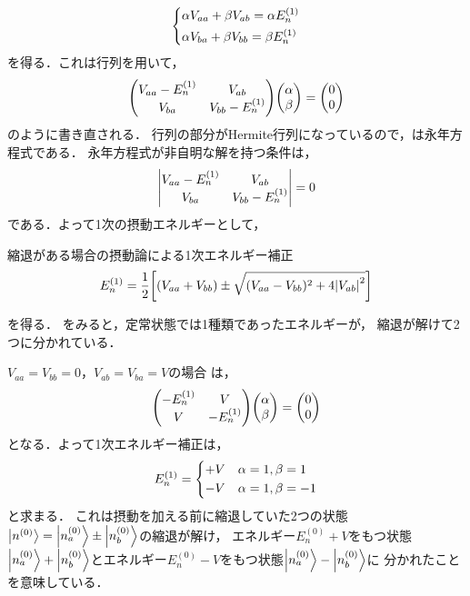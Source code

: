 \documentclass{report}
\begin{document}
  \begin{align}
    \begin{dcases}
      \alpha V_{aa} + \beta V_{ab} = \alpha E_n^{(1)}\\
      \alpha V_{ba} + \beta V_{bb} = \beta E_n^{(1)}
    \end{dcases}
  \end{align}
  を得る．これは行列を用いて，
  \begin{align}
    \mqty(
      V_{aa} - E_n^{(1)} & V_{ab} \\
      V_{ba} & V_{bb} - E_n^{(1)})
    \mqty(\alpha\\ \beta)
    =
    \mqty(0 \\ 0)\label{secular-eq}
  \end{align}
  のように書き直される．
  行列の部分がHermite行列になっているので，は永年方程式である．
  永年方程式が非自明な解を持つ条件は，
  \begin{align}
    \mqty|
      V_{aa} - E_n^{(1)} &  V_{ab}\\
      V_{ba} & V_{bb} - E_n^{(1)}|
    = 0
  \end{align}
  である．よって1次の摂動エネルギーとして，
  \begin{itembox}[l]{縮退がある場合の摂動論による1次エネルギー補正}
    \begin{align}
      E_n^{(1)} = \frac{1}{2}\qty[(V_{aa} + V_{bb})\pm\sqrt{(V_{aa} - V_{bb})^2 + 4\abs{V_{ab}}^2}]\label{1st-order-energy-with-degeneracy}
    \end{align}
  \end{itembox}
  を得る．
  をみると，定常状態では1種類であったエネルギーが，
  縮退が解けて2つに分かれている．
  \begin{myex}{}{}
    $ V_{aa} = V_{bb} = 0$，$ V_{ab} = V_{ba} = V$の場合
    は，
    \begin{align}
      \mqty(
        -E_n^{(1)} &  V\\
        V & -E_n^{(1)})
      \mqty(\alpha\\\beta)
      = \mqty(0\\ 0)
    \end{align}
    となる．よって1次エネルギー補正は，
    \begin{align}
      E_n^{(1)}=
      \begin{dcases}
        + V & \alpha = 1, \beta = 1\\
        - V & \alpha = 1, \beta = -1
      \end{dcases}
    \end{align}
    と求まる．
    これは摂動を加える前に縮退していた2つの状態$\ket{n^{(0)}} = \ket{n_a^{(0)}}\pm\ket{n_b^{(0)}}$の縮退が解け，
    エネルギー$E_n^{(0)} +  V$をもつ状態$\ket{n_a^{(0)}} + \ket{n_b^{(0)}}$とエネルギー$E_n^{(0)} -  V$をもつ状態$\ket{n_a^{(0)}} - \ket{n_b^{(0)}}$に
    分かれたことを意味している．
  \end{myex}
\end{document}

